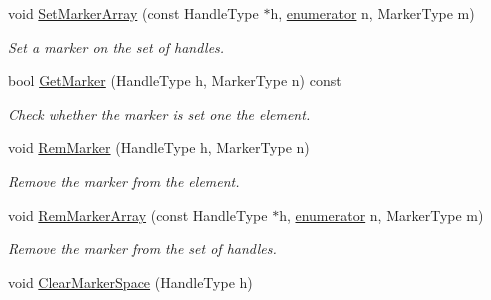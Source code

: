 \begin{DoxyCompactItemize}
void \hyperlink{classINMOST_1_1Mesh_a84ff5329978e77876ca6b1b3ed9b5c39}{Set\-Marker\-Array} (const Handle\-Type $\ast$h, \hyperlink{classINMOST_1_1Storage_ae333dfced6fa9cfde0c8e7dcf1b0cc2b}{enumerator} n, Marker\-Type m)
\begin{DoxyCompactList}\small\item\em Set a marker on the set of handles. \end{DoxyCompactList}\item 
bool \hyperlink{classINMOST_1_1Mesh_a2c8a00522e2b06a0b59e25cae119a237}{Get\-Marker} (Handle\-Type h, Marker\-Type n) const 
\begin{DoxyCompactList}\small\item\em Check whether the marker is set one the element. \end{DoxyCompactList}\item 
void \hyperlink{classINMOST_1_1Mesh_aa758ff129bf79eff3c446946e276006c}{Rem\-Marker} (Handle\-Type h, Marker\-Type n)
\begin{DoxyCompactList}\small\item\em Remove the marker from the element. \end{DoxyCompactList}\item 
void \hyperlink{classINMOST_1_1Mesh_a14f8614996be1f7dd81825a447e9f4e8}{Rem\-Marker\-Array} (const Handle\-Type $\ast$h, \hyperlink{classINMOST_1_1Storage_ae333dfced6fa9cfde0c8e7dcf1b0cc2b}{enumerator} n, Marker\-Type m)
\begin{DoxyCompactList}\small\item\em Remove the marker from the set of handles. \end{DoxyCompactList}\item 
\hypertarget{classINMOST_1_1Mesh_a4b688c3af40eeef80d7d365c56be193f}{void \hyperlink{classINMOST_1_1Mesh_a4b688c3af40eeef80d7d365c56be193f}{Clear\-Marker\-Space} (Handle\-Type h)}\label{classINMOST_1_1Mesh_a4b688c3af40eeef80d7d365c56be193f}


\end{DoxyCompactItemize}
